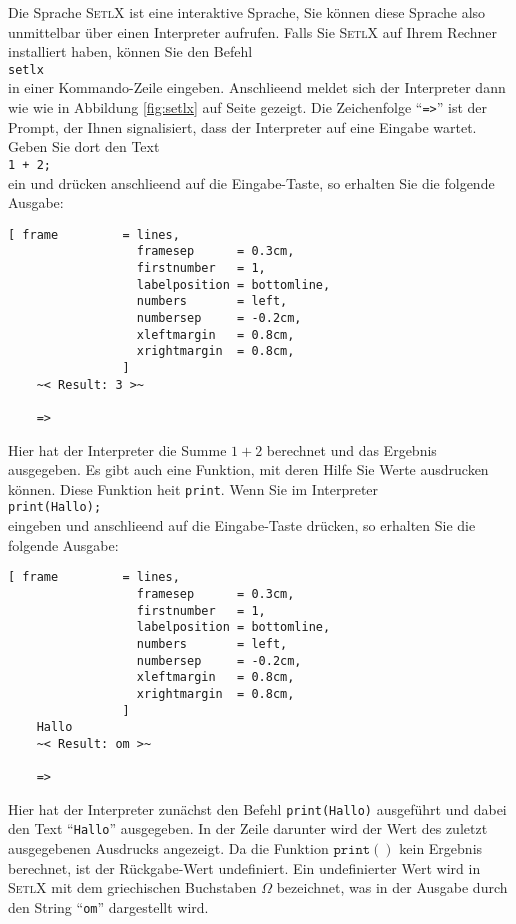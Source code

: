 Die Sprache \textsc{SetlX} ist eine interaktive Sprache, Sie k\"{o}nnen diese
Sprache also unmittelbar \"{u}ber einen Interpreter aufrufen.  Falls Sie \textsc{SetlX} auf
Ihrem Rechner installiert haben, k\"{o}nnen Sie den Befehl
\\[0.2cm]
\hspace*{1.3cm}
\texttt{setlx}
\\[0.2cm]
in einer Kommando-Zeile eingeben.  Anschlie\3end meldet sich der Interpreter dann wie wie
in Abbildung \ref{fig:setlx} auf Seite \pageref{fig:setlx} gezeigt.  Die Zeichenfolge
``\texttt{=>}'' ist der Prompt, der Ihnen signalisiert, dass der Interpreter auf eine Eingabe
wartet.  Geben Sie dort den  Text
\\[0.2cm]
\hspace*{1.3cm}
\texttt{1 + 2;}
\\[0.2cm]
ein und dr\"{u}cken anschlie\3end auf die Eingabe-Taste, so erhalten Sie
die folgende Ausgabe:

\begin{Verbatim}[ frame         = lines, 
                  framesep      = 0.3cm, 
                  firstnumber   = 1,
                  labelposition = bottomline,
                  numbers       = left,
                  numbersep     = -0.2cm,
                  xleftmargin   = 0.8cm,
                  xrightmargin  = 0.8cm,
                ]
    ~< Result: 3 >~
    
    => 
\end{Verbatim}
Hier hat der Interpreter die Summe $1+2$ berechnet und das Ergebnis ausgegeben.  Es gibt auch eine
Funktion, mit deren Hilfe Sie Werte ausdrucken k\"{o}nnen.  Diese Funktion hei\3t \texttt{print}.  Wenn
Sie im Interpreter
\\[0.2cm]
\hspace*{1.3cm}
\texttt{print(Hallo);}
\\[0.2cm]
eingeben und anschlie\3end auf die Eingabe-Taste dr\"{u}cken, so erhalten Sie
die folgende Ausgabe:

\begin{Verbatim}[ frame         = lines, 
                  framesep      = 0.3cm, 
                  firstnumber   = 1,
                  labelposition = bottomline,
                  numbers       = left,
                  numbersep     = -0.2cm,
                  xleftmargin   = 0.8cm,
                  xrightmargin  = 0.8cm,
                ]
    Hallo
    ~< Result: om >~
    
    => 
\end{Verbatim}
Hier hat der Interpreter zun\"{a}chst den Befehl \texttt{print(Hallo)} ausgef\"{u}hrt und dabei
den Text ``\texttt{Hallo}'' ausgegeben.  In der Zeile darunter wird der Wert des zuletzt
ausgegebenen Ausdrucks angezeigt.  Da die Funktion $\texttt{print}()$ kein Ergebnis
berechnet, ist der R\"{u}ckgabe-Wert undefiniert.  Ein undefinierter Wert wird in
\textsc{SetlX} mit dem griechischen Buchstaben
\href{http://en.wikipedia.org/wiki/Greek_alphabet}{$\Omega$} bezeichnet, was in der Ausgabe durch
den String ``\texttt{om}'' dargestellt wird.

